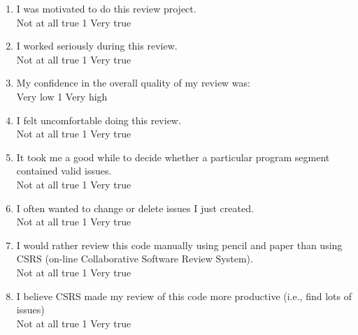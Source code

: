 \begin {enumerate}
\item I was motivated to do this review project.
\\
Not at all true \hfill 1     \hfill Very true\\

\item I worked seriously during this review.
\\
Not at all true \hfill 1     \hfill Very true\\

\item My confidence in the overall quality of my review was:
\\
Very low \hfill 1     \hfill Very high\\


\item I felt uncomfortable doing this review.
\\
Not at all true \hfill 1     \hfill Very true\\


\item It took me a good while to decide whether a particular program
segment contained valid issues.
\\
Not at all true \hfill 1     \hfill Very true\\

\item I often wanted to change or delete issues I just created.
\\
Not at all true \hfill 1     \hfill Very true\\


\item I would rather review this code manually using pencil and paper than
using CSRS (on-line Collaborative Software Review System).
\\
Not at all true \hfill 1     \hfill Very true\\



\item I believe CSRS made my review of this code more productive
(i.e., find lots of issues)
\\
Not at all true \hfill 1     \hfill Very true\\


\end{enumerate}
